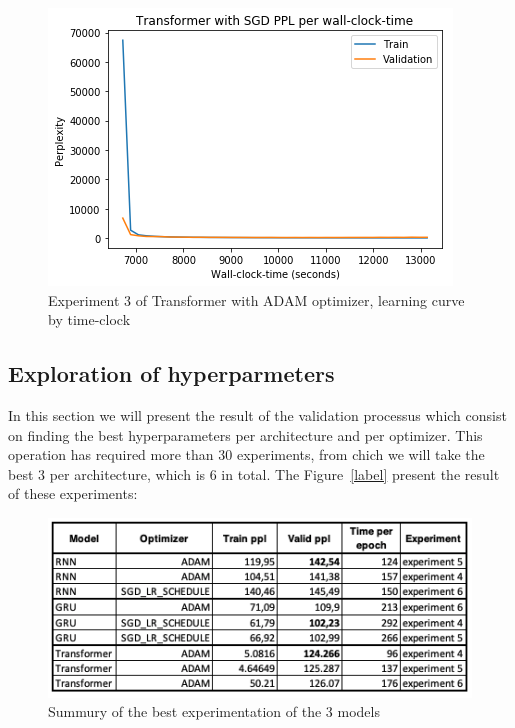 \begin{itemize}
\begin{figure}[H]
	\centering
	\includegraphics[scale=0.8]{Q4-2_TR_SGD_clock.png}
	\caption{Experiment 3 of Transformer with ADAM optimizer, learning curve by time-clock}
	\label{fig:fig18}
\end{figure}

\end{itemize}
%




\subsection{Exploration of hyperparmeters}

In this section we will present the result of the validation processus which consist on finding the best hyperparameters per architecture and per optimizer. This operation has required more than 30 experiments, from chich we will take the best 3 per architecture, which is 6 in total. The Figure~\ref{label} present the result of these experiments:

\begin{figure}[H]
	\centering
	\includegraphics[scale=0.6]{Q4-3_Summury.png}
	\caption{Summury of the best experimentation of the 3 models}
	\label{fig:fig19}
\end{figure}

